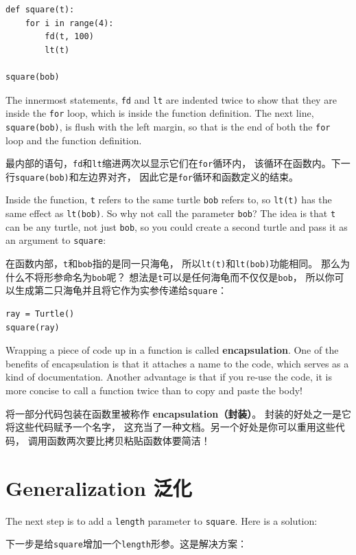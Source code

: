 \documentclass[10pt]{book}
\begin{document}
\begin{CJK}{UTF8}{gbsn}
\begin{verbatim}
def square(t):
    for i in range(4):
        fd(t, 100)
        lt(t)

square(bob)
\end{verbatim}
%
The innermost statements, {\tt fd} and {\tt lt} are
indented twice to show that they are inside the {\tt for} loop,
which is inside the function definition.  The next line,
{\tt square(bob)}, is flush with the left margin, so that is the
end of both the {\tt for} loop and the function definition.

最内部的语句，{\tt fd}和{\tt lt}缩进两次以显示它们在{\tt for}循环内，
该循环在函数内。下一行{\tt square(bob)}和左边界对齐，
因此它是{\tt for}循环和函数定义的结束。

Inside the function, {\tt t} refers to the same turtle {\tt bob}
refers to, so {\tt lt(t)} has the same effect as {\tt lt(bob)}.
So why not call the parameter {\tt bob}?  The idea is that {\tt t}
can be any turtle, not just {\tt bob}, so you could create
a second turtle and pass it as an argument to {\tt square}:

在函数内部，{\tt t}和{\tt bob}指的是同一只海龟，
所以{\tt lt(t)}和{\tt lt(bob)}功能相同。
那么为什么不将形参命名为{\tt bob}呢？
想法是{\tt t}可以是任何海龟而不仅仅是{\tt bob}，
所以你可以生成第二只海龟并且将它作为实参传递给{\tt square}：

\begin{verbatim}
ray = Turtle()
square(ray)
\end{verbatim}
%
Wrapping a piece of code up in a function is called {\bf
encapsulation}.  One of the benefits of encapsulation is that it
attaches a name to the code, which serves as a kind of documentation.
Another advantage is that if you re-use the code, it is more concise
to call a function twice than to copy and paste the body!

将一部分代码包装在函数里被称作 {\bf encapsulation（封装）}。
封装的好处之一是它将这些代码赋予一个名字，
这充当了一种文档。另一个好处是你可以重用这些代码，
调用函数两次要比拷贝粘贴函数体要简洁！

\section{Generalization 泛化}

The next step is to add a {\tt length} parameter to {\tt square}.
Here is a solution:

下一步是给{\tt square}增加一个{\tt length}形参。这是解决方案：


\end{CJK}
\end{document}
